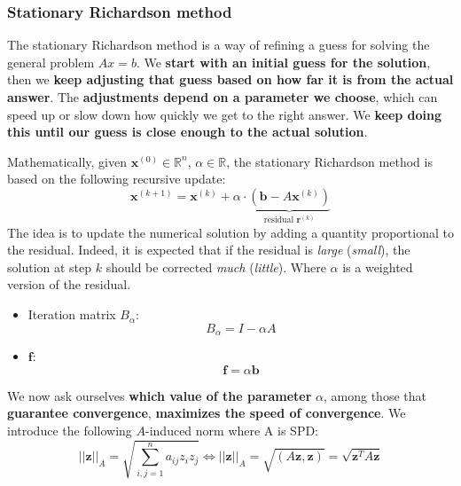 \subsubsection{Stationary Richardson method}\label{subsubsection: The stationary Richardson method}

The stationary Richardson method is a way of refining a guess for solving the general problem $Ax = b$. We \textbf{start with an initial guess for the solution}, then we \textbf{keep adjusting that guess based on how far it is from the actual answer}. The \textbf{adjustments depend on a parameter we choose}, which can speed up or slow down how quickly we get to the right answer. We \textbf{keep doing this until our guess is close enough to the actual solution}.

\highspace
Mathematically, given $\mathbf{x}^{\left(0\right)} \in \mathbb{R}^{n}$, $\alpha \in \mathbb{R}$, the stationary Richardson method is based on the following recursive update:
\begin{equation}\label{eq: stationary richardson x calcolus}
    \mathbf{x}^{\left(k+1\right)} = \mathbf{x}^{\left(k\right)} + \alpha \cdot \underbrace{\left(\mathbf{b} - A\mathbf{x}^{\left(k\right)}\right)}_{\text{residual }\mathbf{r}^{\left(k\right)}}
\end{equation}
The idea is to update the numerical solution by adding a quantity proportional to the residual. Indeed, it is expected that if the residual is \emph{large} (\emph{small}), the solution at step $k$ should be corrected \emph{much} (\emph{little}). Where $\alpha$ is a weighted version of the residual.
\begin{itemize}
    \item Iteration matrix $B_{\alpha}$:
    \begin{equation*}
        B_{\alpha} = I - \alpha A
    \end{equation*}
    \item $\mathbf{f}$:
    \begin{equation*}
        \mathbf{f} = \alpha \mathbf{b}
    \end{equation*}
\end{itemize}
We now ask ourselves \textbf{which value of the parameter} $\alpha$, among those that \textbf{guarantee convergence}, \textbf{maximizes the speed of convergence}. We introduce the following $A$-induced norm where A is SPD:
\begin{equation*}
    {\left|\left|\mathbf{z}\right|\right|}_{A} = \sqrt{
        \displaystyle\sum_{i,j = 1}^{n} a_{ij}z_{i}z_{j}
    }
    \iff
    {\left|\left|\mathbf{z}\right|\right|}_{A} = \sqrt{\left(A\mathbf{z}, \mathbf{z}\right)} = \sqrt{\mathbf{z}^{T} A \mathbf{z}}
\end{equation*}
